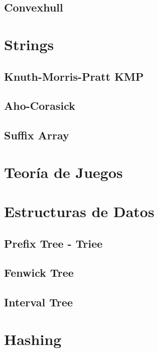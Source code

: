 \documentclass[10pt,letterpaper,twocolumn,twosided]{article}
\begin{document}
\subsection{Convexhull}

\section{Strings}

\subsection{Knuth-Morris-Pratt KMP}

\subsection{Aho-Corasick}

\subsection{Suffix Array}

\section{Teoría de Juegos}

\section{Estructuras de Datos}

\subsection{Prefix Tree - Triee}

\subsection{Fenwick Tree}

\subsection{Interval Tree}

\section{Hashing} %
\end{document}
